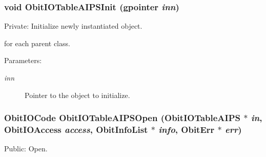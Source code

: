 \subsubsection{\setlength{\rightskip}{0pt plus 5cm}void Obit\-IOTable\-AIPSInit (gpointer {\em inn})}\label{ObitIOTableAIPS_8c_a4}


Private: Initialize newly instantiated object. 

for each parent class. \begin{Desc}
\item[Parameters:]
\begin{description}
\item[{\em inn}]Pointer to the object to initialize. \end{description}
\end{Desc}
\subsubsection{\setlength{\rightskip}{0pt plus 5cm}Obit\-IOCode Obit\-IOTable\-AIPSOpen ({\bf Obit\-IOTable\-AIPS} $\ast$ {\em in}, Obit\-IOAccess {\em access}, {\bf Obit\-Info\-List} $\ast$ {\em info}, {\bf Obit\-Err} $\ast$ {\em err})}\label{ObitIOTableAIPS_8c_a14}


Public: Open. 

